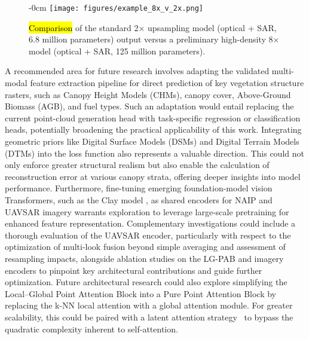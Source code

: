 \documentclass[remotesensing,article,accept,pdftex,moreauthors]{Definitions/mdpi}
\begin{document}
 \vspace{-6pt}

\begin{figure}[H]
    \begin{adjustwidth}{-\extralength}{0cm}
    \centering
    \texttt{[image: figures/example\_8x\_v\_2x.png]}
    \end{adjustwidth}
    \caption{\hl{Comparison} %
 of the standard 2× upsampling model (optical + SAR, 6.8 million parameters) output versus a preliminary high-density 8× model (optical + SAR, 125 million parameters).}
    \label{fig:upsampling_comparison_8x}
\end{figure}

\newpage

A recommended area for future research involves adapting the validated multi-modal feature extraction pipeline for direct prediction of key vegetation structure rasters, such as Canopy Height Models (CHMs), canopy cover, Above-Ground Biomass (AGB), and fuel types. Such an adaptation would entail replacing the current point-cloud generation head with task-specific regression or classification heads, potentially broadening the practical applicability of this work. Integrating geometric priors like Digital Surface Models (DSMs) and Digital Terrain Models (DTMs) into the loss function also represents a valuable direction. This could not only enforce greater structural realism but also enable the calculation of reconstruction error at various canopy strata, offering deeper insights into model performance. Furthermore, fine-tuning emerging foundation-model vision Transformers, such as the Clay model \cite{clay_model_v1p5}, as shared encoders for NAIP and UAVSAR imagery warrants exploration to leverage large-scale pretraining for enhanced feature representation. Complementary investigations could include a thorough evaluation of the UAVSAR encoder, particularly with respect to the optimization of multi-look fusion beyond simple averaging and assessment of resampling impacts, alongside ablation studies on the LG-PAB and imagery encoders to pinpoint key architectural contributions and guide further optimization. Future architectural research could also explore simplifying the Local--Global Point Attention Block into a Pure Point Attention Block by replacing the k-NN local attention with a global attention module. For greater scalability, this could be paired with a latent attention \mbox{strategy \cite{liu2024deepseek}} to bypass the quadratic complexity inherent to self-attention.
\end{document}
